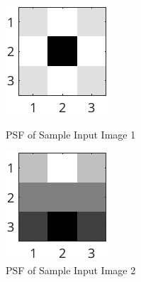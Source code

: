 \documentclass{article}
\begin{document}
\begin{itemize}
  		\begin{figure}[ht]
  			\centering
  			\begin{minipage}[t]{0.45\textwidth}
    			\centering
    			\includegraphics[width=\textwidth]{2AE1PSF_laplacian}
    			\caption{PSF of Sample Input Image 1}
    			\label{fig:laplacian_psf}
  			\end{minipage}\hfill
  			\begin{minipage}[t]{0.45\textwidth}
    			\centering
    			\includegraphics[width=\textwidth]{2AE2PSF_sobel}
    			\caption{PSF of Sample Input Image 2}
    			\label{fig:sobel_psf}
  			\end{minipage}
			\end{figure}


\end{itemize}
\end{document}
